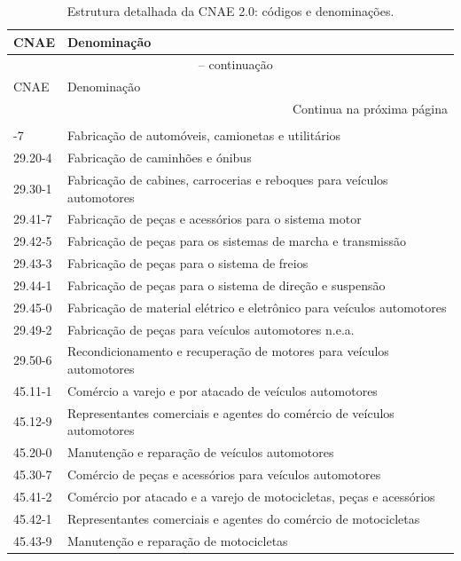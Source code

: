 \documentclass[12pt,a4paper]{article}
\begin{document}
\begin{longtable}{@{}ll@{}}
\caption{Estrutura detalhada da CNAE 2.0: c\'odigos e denomina\c{c}\~oes.}
\label{tab:cnae} \\
\toprule
CNAE     & Denomina\c{c}\~ao \\
\midrule
\endfirsthead
\multicolumn{2}{c}{{\tablename\ \thetable{} -- continua\c{c}\~ao}} \\
\toprule
CNAE     & Denomina\c{c}\~ao \\
\midrule
\endhead
\midrule
\multicolumn{2}{r}{{\footnotesize Continua na pr\'oxima p\'agina}} \\
\endfoot
\bottomrule
\multicolumn{2}{l}{\footnotesize Fonte: Classifica\c{c}\~ao Nacional de Atividades Econ\^omicas (CNAE), \textcite{ibge2026}.}\\
\endlastfoot
29.10-7 & Fabrica\c{c}\~ao de autom\'oveis, camionetas e utilit\'arios \\
29.20-4 & Fabrica\c{c}\~ao de caminh\~oes e \'onibus \\
29.30-1 & Fabrica\c{c}\~ao de cabines, carrocerias e reboques para ve\'iculos automotores \\
29.41-7 & Fabrica\c{c}\~ao de pe\c{c}as e acess\'orios para o sistema motor \\
29.42-5 & Fabrica\c{c}\~ao de pe\c{c}as para os sistemas de marcha e transmiss\~ao \\
29.43-3 & Fabrica\c{c}\~ao de pe\c{c}as para o sistema de freios \\
29.44-1 & Fabrica\c{c}\~ao de pe\c{c}as para o sistema de dire\c{c}\~ao e suspens\~ao \\
29.45-0 & Fabrica\c{c}\~ao de material el\'etrico e eletr\^onico para ve\'iculos automotores \\
29.49-2 & Fabrica\c{c}\~ao de pe\c{c}as para ve\'iculos automotores n.e.a. \\
29.50-6 & Recondicionamento e recupera\c{c}\~ao de motores para ve\'iculos automotores \\
45.11-1 & Com\'ercio a varejo e por atacado de ve\'iculos automotores \\
45.12-9 & Representantes comerciais e agentes do com\'ercio de ve\'iculos automotores \\
45.20-0 & Manuten\c{c}\~ao e repara\c{c}\~ao de ve\'iculos automotores \\
45.30-7 & Com\'ercio de pe\c{c}as e acess\'orios para ve\'iculos automotores \\
45.41-2 & Com\'ercio por atacado e a varejo de motocicletas, pe\c{c}as e acess\'orios \\
45.42-1 & Representantes comerciais e agentes do com\'ercio de motocicletas \\
45.43-9 & Manuten\c{c}\~ao e repara\c{c}\~ao de motocicletas \\
\end{longtable}
\end{document}
